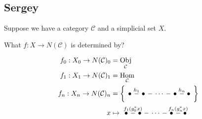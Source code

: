 \documentclass{article}
\newcommand{\Cc}{\mathcal{C}}
\DeclareMathOperator{\Obj}{Obj}
\DeclareMathOperator{\Hom}{Hom}
\begin{document}
\subsection{Sergey}
Suppose we have a category $\Cc$ and a simplicial set $X$.
\begin{question}
	What $f:X\to N(\Cc)$ is determined by?
\end{question}
\begin{align*}
	f_0:X_0\to N(\Cc)_0&=\Obj_{\Cc}\\
f_1:X_1\to N(\Cc)_1&=\Hom_{\Cc}\\
f_n:X_n\to N(\Cc)_n&=\left\{\begin{tikzcd}[column sep=tiny,ampersand replacement=\&]
	\bullet\arrow[r,"h_1",no head]\&\bullet\arrow[r,no head]\&\cdots\arrow[r,no head]\&\bullet\arrow[r,"h_n",no head]\&\bullet
\end{tikzcd}\right\}\\
x&\mapsto\begin{tikzcd}[column sep=tiny,ampersand replacement=\&]
	\bullet\arrow[r,"f_1(g^*_0x)",no head]\&\bullet\arrow[r,no head]\&\cdots\arrow[r,no head]\&\bullet\arrow[r,"f_n(g^*_nx)",no head]\&\bullet
\end{tikzcd}
\end{align*}
\end{document}
